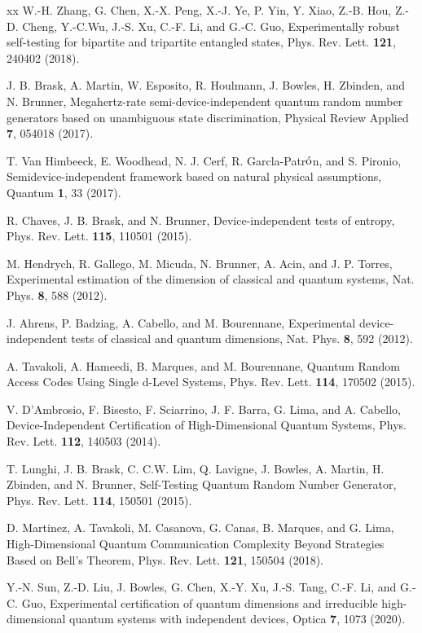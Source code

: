 \documentclass[letterpaper,preprint,superscriptaddress,floatfix,showpacs]{revtex4}
\begin{document}
\begin{thebibliography}{xx}
 W.-H. Zhang, G. Chen, X.-X. Peng, X.-J. Ye, P. Yin, Y. Xiao, Z.-B. Hou, Z.-D. Cheng, Y.-C.Wu, J.-S. Xu, C.-F. Li, and G.-C. Guo, Experimentally robust self-testing for bipartite and tripartite entangled states, Phys. Rev. Lett. {\bf 121}, 240402 (2018).


 J. B. Brask, A. Martin, W. Esposito, R. Houlmann, J. Bowles, H. Zbinden, and N. Brunner, Megahertz-rate semi-device-independent quantum random number generators based on unambiguous state discrimination, Physical Review Applied {\bf 7}, 054018 (2017).

 T. Van Himbeeck, E. Woodhead, N. J. Cerf, R. Garcla-Patr$\rm \acute{o}$n, and S. Pironio, Semidevice-independent framework based on natural physical assumptions, Quantum {\bf 1}, 33 (2017).

 R. Chaves, J. B. Brask, and N. Brunner, Device-independent tests of entropy, Phys. Rev. Lett. {\bf 115}, 110501 (2015).

 M. Hendrych, R. Gallego, M. Micuda, N. Brunner, A. Acin, and J. P. Torres, Experimental estimation of the dimension of classical and quantum systems, Nat. Phys. {\bf 8}, 588 (2012).

 J. Ahrens, P. Badziag, A. Cabello, and M. Bourennane, Experimental device-independent tests of classical and quantum dimensions, Nat. Phys. {\bf 8}, 592 (2012).

 A. Tavakoli, A. Hameedi, B. Marques, and M. Bourennane, Quantum Random Access Codes Using Single d-Level Systems, Phys. Rev. Lett. {\bf 114}, 170502 (2015).

 V. D\textquoteright Ambrosio, F. Bisesto, F. Sciarrino, J. F. Barra, G. Lima, and A. Cabello, Device-Independent Certification of High-Dimensional Quantum Systems, Phys. Rev. Lett. {\bf 112}, 140503 (2014).

 T. Lunghi, J. B. Brask, C. C.W. Lim, Q. Lavigne, J. Bowles, A. Martin, H. Zbinden, and N. Brunner, Self-Testing Quantum Random Number Generator, Phys. Rev. Lett. {\bf 114}, 150501 (2015).

 D. Martinez, A. Tavakoli, M. Casanova, G. Canas, B. Marques, and G. Lima, High-Dimensional Quantum Communication Complexity Beyond Strategies Based on Bell's Theorem, Phys. Rev. Lett. {\bf 121}, 150504 (2018).


 Y.-N. Sun, Z.-D. Liu, J. Bowles, G. Chen, X.-Y. Xu, J.-S. Tang, C.-F. Li, and G.-C. Guo, Experimental certification of quantum dimensions and irreducible high-dimensional quantum systems with independent devices, Optica {\bf 7}, 1073 (2020).



\end{thebibliography}
\end{document}
